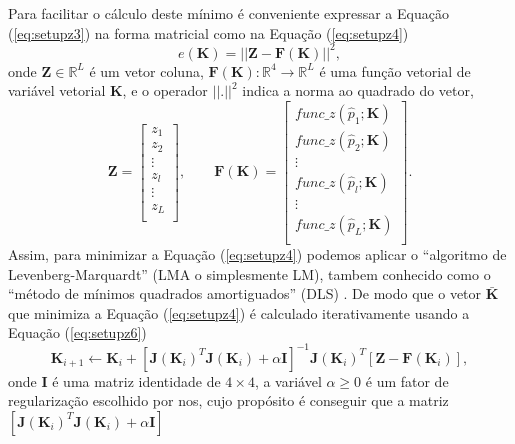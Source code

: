 \documentclass[12pt]{article}
\begin{document}
Para facilitar o cálculo deste mínimo é conveniente expressar a Equação (\ref{eq:setupz3})
na forma matricial como na Equação (\ref{eq:setupz4})
\begin{equation}\label{eq:setupz4}
e\left(\mathbf{K}\right)=|| \mathbf{Z}-\mathbf{F}(\mathbf{K}) ||^2,
\end{equation}
onde $\mathbf{Z}\in \mathbb{R}^L$ é um vetor coluna, 
$\mathbf{F}(\mathbf{K}):\mathbb{R}^4 \rightarrow \mathbb{R}^L$ é uma 
função vetorial de variável vetorial $\mathbf{K}$, e o operador $||.||^2$ indica a norma ao quadrado do vetor,
\begin{equation}
\mathbf{Z}=
\begin{bmatrix}
z_1\\
z_2\\
\vdots\\
z_l\\
\vdots\\
z_L\\
\end{bmatrix},
\qquad
\mathbf{F}(\mathbf{K})=
\begin{bmatrix}
func\_z(\hat{p}_1;\mathbf{K})\\
func\_z(\hat{p}_2;\mathbf{K})\\
\vdots\\
func\_z(\hat{p}_l;\mathbf{K})\\
\vdots\\
func\_z(\hat{p}_L;\mathbf{K})\\
\end{bmatrix}.
\end{equation}
Assim, para minimizar a Equação (\ref{eq:setupz4}) podemos aplicar o
``algoritmo de Levenberg-Marquardt'' (LMA o simplesmente LM), 
tambem conhecido como o ``método de mínimos quadrados amortiguados'' (DLS)
\cite[pp. 232-234]{doicu2010numerical}.
De modo que o vetor $\mathbf{\bar{K}}$ que minimiza a  Equação (\ref{eq:setupz4})
é calculado iterativamente usando a  Equação (\ref{eq:setupz6}) 
\begin{equation}\label{eq:setupz6}
\mathbf{K}_{i+1}\leftarrow\mathbf{K}_{i}+ 
\left[\mathbf{J}(\mathbf{K}_i)^{T}\mathbf{J}(\mathbf{K}_i)+\alpha\mathbf{I}\right]^{-1}
\mathbf{J}(\mathbf{K}_i)^{T}\left[\mathbf{Z}-\mathbf{F}(\mathbf{K}_i)\right],
\end{equation}
onde $\mathbf{I}$ é uma matriz identidade de $4\times 4$, 
a variável $\alpha\geq 0$ é um fator de regularização escolhido por nos,
cujo propósito é conseguir que a matriz 
$\left[\mathbf{J}(\mathbf{K}_i)^{T}\mathbf{J}(\mathbf{K}_i)+\alpha\mathbf{I}\right]$
\end{document}
